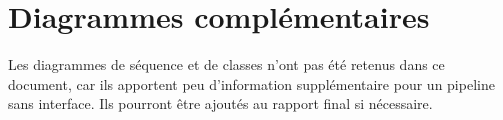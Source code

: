 \documentclass[12pt,a4paper]{report}
\begin{document}
\section{Diagrammes complémentaires}
Les diagrammes de séquence et de classes n'ont pas été retenus dans ce document,
car ils apportent peu d'information supplémentaire pour un pipeline sans interface.
Ils pourront être ajoutés au rapport final si nécessaire.
\end{document}
